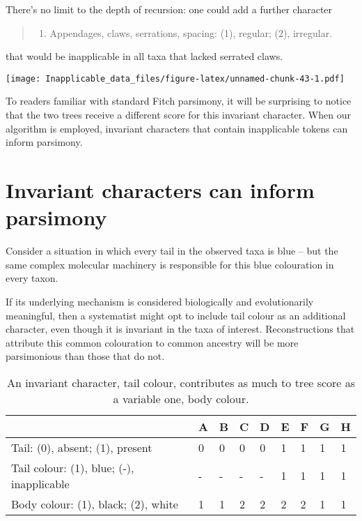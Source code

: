 \documentclass[]{book}
\providecommand{\tightlist}{%
  \setlength{\itemsep}{0pt}\setlength{\parskip}{0pt}}
\theoremstyle{definition}
\theoremstyle{definition}
\theoremstyle{definition}
\theoremstyle{remark}
\begin{document}
There's no limit to the depth of recursion: one could add a further
character

\begin{quote}
\begin{enumerate}
\def\labelenumi{\arabic{enumi}.}
\setcounter{enumi}{4}
\tightlist
\item
  Appendages, claws, serrations, spacing: (1), regular; (2), irregular.
\end{enumerate}
\end{quote}

that would be inapplicable in all taxa that lacked serrated claws.

\texttt{[image: Inapplicable\_data\_files/figure-latex/unnamed-chunk-43-1.pdf]}

To readers familiar with standard Fitch parsimony, it will be surprising
to notice that the two trees receive a different score for this
invariant character. When our algorithm is employed, invariant
characters that contain inapplicable tokens can inform parsimony.

\section{Invariant characters can inform
parsimony}\label{invariant-characters-can-inform-parsimony}

Consider a situation in which every tail in the observed taxa is blue --
but the same complex molecular machinery is responsible for this blue
colouration in every taxon.

If its underlying mechanism is considered biologically and
evolutionarily meaningful, then a systematist might opt to include tail
colour as an additional character, even though it is invariant in the
taxa of interest. Reconstructions that attribute this common colouration
to common ancestry will be more parsimonious than those that do not.

\begin{table}

\caption{\label{tab:unnamed-chunk-44}An invariant character, tail colour, contributes as much to tree score as a variable one, body colour.}
\centering
\begin{tabular}[t]{l|l|l|l|l|l|l|l|l}
\hline
  & A & B & C & D & E & F & G & H\\
\hline
Tail: (0), absent; (1), present & 0 & 0 & 0 & 0 & 1 & 1 & 1 & 1\\
\hline
Tail colour: (1), blue; (-), inapplicable & - & - & - & - & 1 & 1 & 1 & 1\\
\hline
Body colour: (1), black; (2), white & 1 & 1 & 2 & 2 & 2 & 2 & 1 & 1\\
\hline
\end{tabular}
\end{table}
\end{document}
